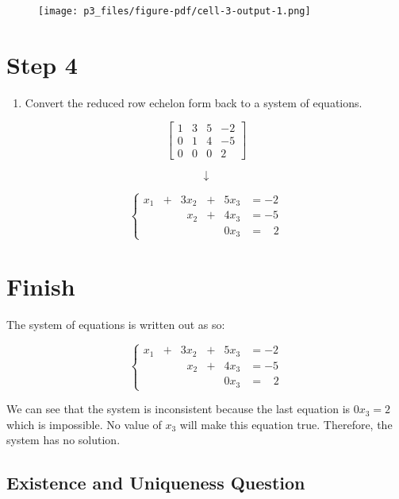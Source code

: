 \documentclass[
  letterpaper,
  DIV=11,
  numbers=noendperiod]{scrreprt}
\providecommand{\tightlist}{%
  \setlength{\itemsep}{0pt}\setlength{\parskip}{0pt}}\usepackage{longtable,booktabs,array}
\begin{document}
\begin{figure}[H]

{\centering \texttt{[image: p3\_files/figure-pdf/cell-3-output-1.png]}

}

\end{figure}

\chapter{Step 4}

\begin{enumerate}
\def\labelenumi{\arabic{enumi}.}
\setcounter{enumi}{3}
\tightlist
\item
  Convert the reduced row echelon form back to a system of equations.
\end{enumerate}

\[
\displaystyle \left[\begin{matrix}1 & 3 & 5 & -2\\0 & 1 & 4 & -5\\0 & 0 & 0 & 2\end{matrix}\right]
\]

\[  
\downarrow
\]

\[
\begin{cases}
x_1 &+ &3x_2 &+ &5x_3 &= -2 \\
& &\;\;x_2 &+ &4x_3 &= -5 \\
& & & &0x_3 &= \;\;\;2
\end{cases}
\]

\chapter{Finish}

The system of equations is written out as so:

\[
\begin{cases}
x_1 &+ &3x_2 &+ &5x_3 &= -2 \\
& &\;\;x_2 &+ &4x_3 &= -5 \\
& & & &0x_3 &= \;\;\;2
\end{cases}
\]

We can see that the system is inconsistent because the last equation is
\(0x_3 = 2\) which is impossible. No value of \(x_3\) will make this
equation true. Therefore, the system has no solution.

\hypertarget{existence-and-uniqueness-question}{%
\section*{Existence and Uniqueness
Question}\label{existence-and-uniqueness-question}}
\end{document}
